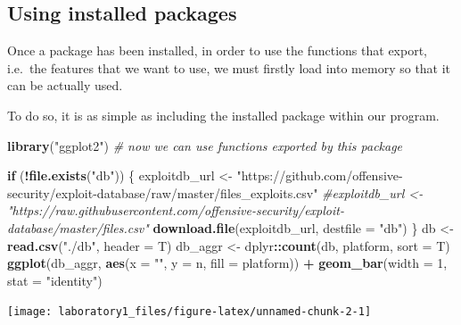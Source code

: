 \documentclass[]{article}
\newenvironment{Shaded}{\begin{snugshade}}{\end{snugshade}}
\newcommand{\KeywordTok}[1]{\textcolor[rgb]{0.13,0.29,0.53}{\textbf{#1}}}
\newcommand{\DataTypeTok}[1]{\textcolor[rgb]{0.13,0.29,0.53}{#1}}
\newcommand{\DecValTok}[1]{\textcolor[rgb]{0.00,0.00,0.81}{#1}}
\newcommand{\StringTok}[1]{\textcolor[rgb]{0.31,0.60,0.02}{#1}}
\newcommand{\CommentTok}[1]{\textcolor[rgb]{0.56,0.35,0.01}{\textit{#1}}}
\newcommand{\ControlFlowTok}[1]{\textcolor[rgb]{0.13,0.29,0.53}{\textbf{#1}}}
\newcommand{\OperatorTok}[1]{\textcolor[rgb]{0.81,0.36,0.00}{\textbf{#1}}}
\newcommand{\NormalTok}[1]{#1}
\begin{document}
\subsection{Using installed packages}\label{using-installed-packages}

Once a package has been installed, in order to use the functions that
export, i.e.~the features that we want to use, we must firstly load into
memory so that it can be actually used.

To do so, it is as simple as including the installed package within our
program.

\begin{Shaded}
\begin{Highlighting}[]
\KeywordTok{library}\NormalTok{(}\StringTok{"ggplot2"}\NormalTok{)}
\CommentTok{# now we can use functions exported by this package}
\end{Highlighting}
\end{Shaded}

\begin{Shaded}
\begin{Highlighting}[]
\ControlFlowTok{if}\NormalTok{ (}\OperatorTok{!}\KeywordTok{file.exists}\NormalTok{(}\StringTok{"db"}\NormalTok{)) \{}
\NormalTok{  exploitdb_url <-}\StringTok{ "https://github.com/offensive-security/exploit-database/raw/master/files_exploits.csv"}
  \CommentTok{#exploitdb_url <- "https://raw.githubusercontent.com/offensive-security/exploit-database/master/files.csv"}
  \KeywordTok{download.file}\NormalTok{(exploitdb_url, }\DataTypeTok{destfile =} \StringTok{"db"}\NormalTok{)}
\NormalTok{\}}
\NormalTok{db <-}\StringTok{ }\KeywordTok{read.csv}\NormalTok{(}\StringTok{"./db"}\NormalTok{, }\DataTypeTok{header =}\NormalTok{ T)}
\NormalTok{db_aggr <-}\StringTok{ }\NormalTok{dplyr}\OperatorTok{::}\KeywordTok{count}\NormalTok{(db, platform, }\DataTypeTok{sort =}\NormalTok{ T)}
\KeywordTok{ggplot}\NormalTok{(db_aggr, }\KeywordTok{aes}\NormalTok{(}\DataTypeTok{x =} \StringTok{""}\NormalTok{, }\DataTypeTok{y =}\NormalTok{ n, }\DataTypeTok{fill =}\NormalTok{ platform)) }\OperatorTok{+}\StringTok{ }\KeywordTok{geom_bar}\NormalTok{(}\DataTypeTok{width =} \DecValTok{1}\NormalTok{, }\DataTypeTok{stat =} \StringTok{"identity"}\NormalTok{)}
\end{Highlighting}
\end{Shaded}

\begin{center}\texttt{[image: laboratory1\_files/figure-latex/unnamed-chunk-2-1]} \end{center}
\end{document}
